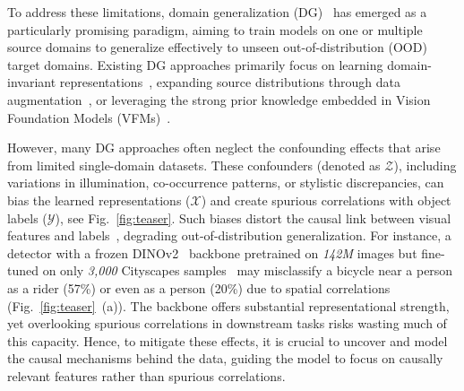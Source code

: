 To address these limitations, domain generalization (DG)~\cite{blanchard2011generalizing} has emerged as a particularly promising paradigm, aiming to train models on one or multiple source domains to generalize effectively to unseen out-of-distribution (OOD) target domains. 
Existing DG approaches primarily focus on learning domain-invariant representations~\cite{li2018deep,rahman2020correlation,albuquerque2019generalizing,deng2020representation}, expanding source distributions through data augmentation~\cite{tobin2017domain,peng2018sim,xu2021fourier,zhou2021domain}, or leveraging the strong prior knowledge embedded in Vision Foundation Models (VFMs)~\cite{wei2024stronger,yun2025soma,he2025generalized,he2025boosting}.

However, many DG approaches often neglect the confounding effects that arise from limited single-domain datasets. 
These confounders (denoted as $\mathcal{Z}$), including variations in illumination, co-occurrence patterns, or stylistic discrepancies, can bias the learned representations ($\mathcal{X}$) and create spurious correlations with object labels ($\mathcal{Y}$), see Fig.~\ref{fig:teaser}.
Such biases distort the causal link between visual features and labels~\cite{wang2020visual,zhang2022multiple,zhang2020causal,shao2021improving}, degrading out-of-distribution generalization.
For instance, a detector with a frozen DINOv2~\cite{oquab2023dinov2} backbone pretrained on \textit{142M} images but fine-tuned on only \textit{3,000} Cityscapes samples~\cite{cordts2016cityscapes} may misclassify a bicycle near a person as a rider (57\%) or even as a person (20\%) due to spatial correlations (Fig.~\ref{fig:teaser}~(a)).
The backbone offers substantial representational strength, yet overlooking spurious correlations in downstream tasks risks wasting much of this capacity.
Hence, to mitigate these effects, it is crucial to uncover and model the causal mechanisms behind the data, guiding the model to focus on causally relevant features rather than spurious correlations.








